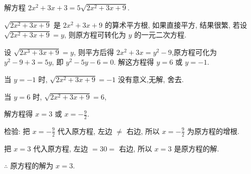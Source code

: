 \begin{example}
	解方程 $2 x^2+3 x+3=5 \sqrt{2 x^2+3 x+9}$.
\end{example}
\begin{analysis}
	$\sqrt{2 x^2+3 x+9}$ 是 $2 x^2+3 x+9$ 的算术平方根, 如果直接平方, 结果很繁, 若设 $\sqrt{2 x^2+3 x+9}=y$, 则原方程可转化为 $y$ 的一元二次方程.
\end{analysis}
\begin{solution}
设 $\sqrt{2 x^3+3 x+9}=y$, 则平方后得 $2 x^2+3 x=y^2-9$,原方程可化为 $y^2-9+3=5 y$, 即 $y^2-5 y-6=0$.
解这方程得 $y=6$ 或 $y=-1$.

当 $y=-1$ 时, $\sqrt{2 x^2+3 x+9}=-1$ 没有意义,无解, 舍去.

当 $y=6$ 时, $\sqrt{2 x^2+3 x+9}=6$,

解方程得 $x=3$ 或 $x=-\frac{9}{2}$.

检验: 把 $x=-\frac{9}{2}$ 代入原方程, 左边 $\neq$ 右边, 所以 $x=-\frac{9}{2}$ 为原方程的增根.

把 $x=3$ 代入原方程, 左边 $=30=$ 右边, 所以 $x=3$ 是原方程的解.

$\therefore$ 原方程的解为 $x=3$.
\end{solution}
